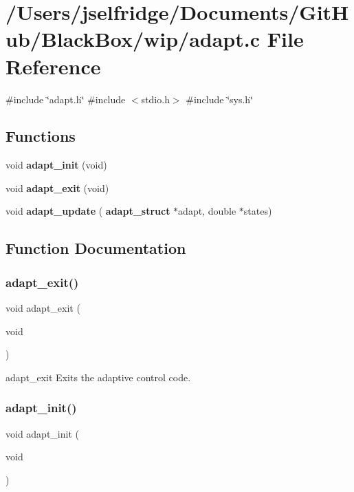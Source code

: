 \section{/\+Users/jselfridge/\+Documents/\+Git\+Hub/\+Black\+Box/wip/adapt.c File Reference}
\label{adapt_8c}
{\ttfamily \#include \char`\"{}adapt.\+h\char`\"{}}\newline
{\ttfamily \#include $<$stdio.\+h$>$}\newline
{\ttfamily \#include \char`\"{}sys.\+h\char`\"{}}\newline
\subsection*{Functions}
\begin{DoxyCompactItemize}
\item 
void \textbf{ adapt\+\_\+init} (void)
\item 
void \textbf{ adapt\+\_\+exit} (void)
\item 
void \textbf{ adapt\+\_\+update} (\textbf{ adapt\+\_\+struct} $\ast$adapt, double $\ast$states)
\end{DoxyCompactItemize}


\subsection{Function Documentation}
\mbox{\label{adapt_8c_a2fe8f1b4c9bcdfeec1db1d6009019961}} 
\subsubsection{adapt\+\_\+exit()}
{\footnotesize\ttfamily void adapt\+\_\+exit (\begin{DoxyParamCaption}\item[{void}]{ }\end{DoxyParamCaption})}

adapt\+\_\+exit Exits the adaptive control code. \mbox{\label{adapt_8c_ae064612259be9bffa6840e25cfa0b0d9}} 
\subsubsection{adapt\+\_\+init()}
{\footnotesize\ttfamily void adapt\+\_\+init (\begin{DoxyParamCaption}\item[{void}]{ }\end{DoxyParamCaption})}

